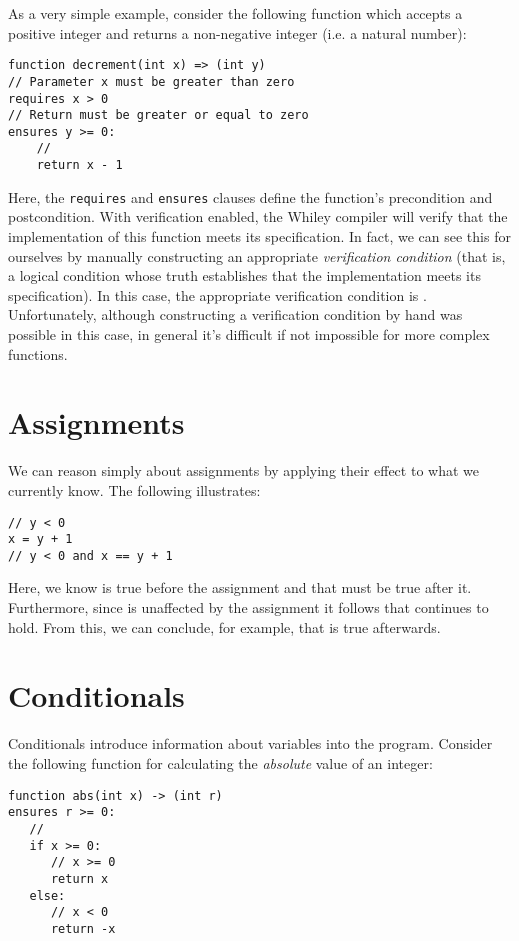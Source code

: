 As a very simple example, consider the following function which accepts a positive integer and returns a
non-negative integer (i.e. a natural number):
\begin{lstlisting}
function decrement(int x) => (int y) 
// Parameter x must be greater than zero
requires x > 0
// Return must be greater or equal to zero
ensures y >= 0:
    //
    return x - 1
\end{lstlisting}
Here, the \lstinline{requires} and \lstinline{ensures} clauses define the function's precondition and postcondition.  With verification enabled, the Whiley compiler will verify that the implementation of this function meets its specification.  In fact, we can see this for ourselves by manually constructing an appropriate {\em verification condition} (that is, a logical condition whose truth establishes that the implementation meets its specification).  In this case, the appropriate verification condition is .  Unfortunately, although constructing a verification condition by hand was possible in this case, in general it's difficult if not impossible for more complex functions.

\section{Assignments}

We can reason simply about assignments by applying their effect to what we currently know.  The following illustrates:

\begin{lstlisting}
// y < 0 
x = y + 1
// y < 0 and x == y + 1
\end{lstlisting}

Here, we know  is true before the assignment and that  must be true after it.  Furthermore, since  is unaffected by the assignment it follows that  continues to hold.  From this, we can conclude, for example, that  is true afterwards.  

\section{Conditionals}

Conditionals introduce information about variables into the program.  Consider the following function for calculating the {\em absolute} value of an integer:

\begin{lstlisting}
function abs(int x) -> (int r)
ensures r >= 0:
   //
   if x >= 0:
      // x >= 0
      return x
   else:
      // x < 0
      return -x
\end{lstlisting}

